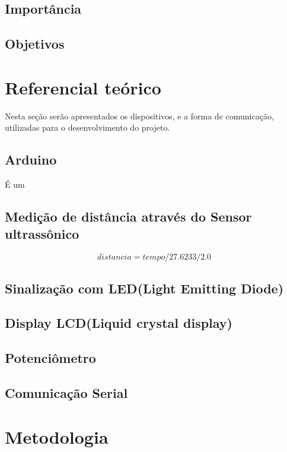 \documentclass[conference]{IEEEtran}
\begin{document}
\subsection{Importância}

\subsection{Objetivos}

\section{Referencial teórico}
Nesta seção serão apresentados os dispositivos, e a forma de comunicação, utilizadas para o desenvolvimento do projeto.
\subsection{Arduino}
É um
\subsection{Medição de distância através do Sensor ultrassônico}

\begin{equation}
    distancia = tempo / 27.6233 / 2.0 \label{eq}
\end{equation}

\subsection{Sinalização com LED(Light Emitting Diode)}
\subsection{Display LCD(Liquid crystal display)}
\subsection{Potenciômetro}
\subsection{Comunicação Serial}

\section{Metodologia}
\end{document}
